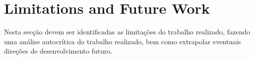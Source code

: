 \section{Limitations and Future Work} %
\label{sec:limitations}

Nesta secção devem ser identificadas as limitações do trabalho realizado, fazendo uma análise autocrítica do trabalho realizado, bem como extrapolar eventuais direções de desenvolvimento futuro.

